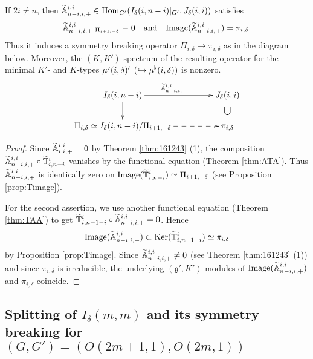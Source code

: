 \begin{proposition}
\label{prop:170530}
If $2i \ne n$, 
 then 
$
   {\widetilde{\mathbb{A}}}_{{n-i},{i},{+}}^{{i,i}}
   \in 
   {\operatorname{Hom}}_{G'}
   (I_\delta(i,n-i)|_{G'}, J_\delta(i,i))
$ 
satisfies
\[
   {\widetilde{\mathbb{A}}}_{{n-i},{i},{+}}^{{i,i}}|_{\Pi_{i+1,-\delta}} \equiv 0
\quad
   \text{and}
\quad
   {\operatorname{Image}}({\widetilde{\mathbb{A}}}_{{n-i},{i},{+}}^{{i,i}})
   = \pi_{i,\delta}.  
\]
Thus it induces a symmetry breaking operator 
$\Pi_{i,\delta} \to \pi_{i,\delta}$
 as in the diagram below.  
Moreover,
 the $(K,K')$-spectrum
 of the resulting operator 
 for the minimal $K'$- and $K$-types $\mu^{\flat} (i,\delta)'$
 $(\hookrightarrow \mu^{\flat}(i,\delta))$ is nonzero.  
\begin{eqnarray*}
\xymatrix@C=20pt@R=2pt{
I_{\delta}(i,n-i)\ar[rr]^{\Atbb {n-i}{i}+ {i,i}\,\,}
\ar[dd]
&& J_{\delta}(i,i)
\\
&&\bigcup
\\
\Pi_{i,\delta} \simeq
I_{\delta}(i,n-i)/\Pi_{i+1,-\delta}
\ar@{-->}[rr]
&&\pi_{i,\delta}
}
\end{eqnarray*}
\end{proposition}

\begin{proof}
Since ${\widetilde{\mathbb{A}}}_{{i},{i},{+}}^{{i,i}} =0$
 by Theorem \ref{thm:161243} (1), 
 the composition 
$
     {\widetilde{\mathbb{A}}}_{{n-i},{i},{+}}^{{i,i}} \circ \widetilde{{\mathbb{T}}}_{{i},{n-i}}^{{i}}
$
 vanishes by the functional equation (Theorem \ref{thm:ATA}).  
Thus ${\widetilde{\mathbb{A}}}_{{n-i},{i},{+}}^{{i,i}}$ is identically zero
 on ${\operatorname{Image}} (\widetilde{{\mathbb{T}}}_{{i},{n-i}}^{{i}}) \simeq \Pi_{i+1,-\delta}$
 (see Proposition \ref{prop:Timage}).  



For the second assertion,
 we use another functional equation 
 (Theorem \ref{thm:TAA})
 to get $\widetilde{{\mathbb{T}}}_{{i},{n-1-i}}^{{i}} \circ {\widetilde{\mathbb{A}}}_{{n-i},{i},{+}}^{{i,i}}=0$.  
Hence
\[
     {\operatorname{Image}}({\widetilde{\mathbb{A}}}_{{n-i},{i},{+}}^{{i,i}})
     \subset
     {\operatorname{Ker}}(\widetilde{{\mathbb{T}}}_{{i},{n-1-i}}^{{i}})
     \simeq 
     \pi_{i,\delta}
\]
 by Proposition \ref{prop:Timage}.  
Since ${\widetilde{\mathbb{A}}}_{{n-i},{i},{+}}^{{i,i}} \ne 0$
(see Theorem \ref{thm:161243} (1))
 and since $\pi_{i,\delta}$ is irreducible,
 the underlying $({\mathfrak{g}}',K')$-modules
 of ${\operatorname{Image}}({\widetilde{\mathbb{A}}}_{{n-i},{i},{+}}^{{i,i}})$
 and $\pi_{i,\delta}$ coincide.  
\end{proof}




\subsection{Splitting of $I_{\delta}(m,m)$ and its symmetry breaking for $(G,G')=(O(2m+1,1),O(2m,1))$}
\label{subsec:2m}

